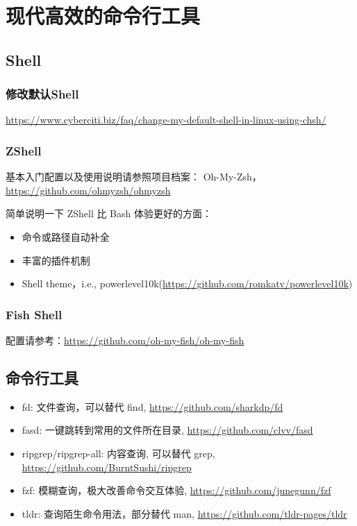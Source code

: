 \chapter{现代高效的命令行工具}

\section{Shell}
\label{sec:shell}

\subsection{修改默认Shell}

\url{https://www.cyberciti.biz/faq/change-my-default-shell-in-linux-using-chsh/}


\subsection{ZShell}
\label{sec:zshell}

基本入门配置以及使用说明请参照项目档案： Oh-My-Zsh，\url{https://github.com/ohmyzsh/ohmyzsh}

简单说明一下 ZShell 比 Bash 体验更好的方面：
\begin{itemize}
\item 命令或路径自动补全
\item 丰富的插件机制
\item Shell theme，i.e., powerlevel10k(\url{https://github.com/romkatv/powerlevel10k})
\end{itemize}

\subsection{Fish Shell}
配置请参考：\url{https://github.com/oh-my-fish/oh-my-fish}

\section{命令行工具}

\begin{itemize}
\item fd: 文件查询，可以替代 find, \url{https://github.com/sharkdp/fd}
\item fasd: 一键跳转到常用的文件所在目录, \url{https://github.com/clvv/fasd}
\item ripgrep/ripgrep-all: 内容查询, 可以替代 grep, \url{https://github.com/BurntSushi/ripgrep}
\item fzf: 模糊查询，极大改善命令交互体验, \url{https://github.com/junegunn/fzf}
\item tldr: 查询陌生命令用法，部分替代 man, \url{https://github.com/tldr-pages/tldr}
\end{itemize}

\label{sec:tools}

